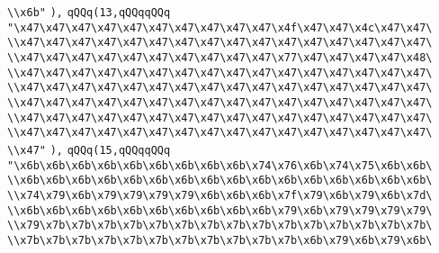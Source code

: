 \verb|\\x6b"|\newline
\verb|),|\newline
\verb|qQQq(13,qQQqqQQq|\newline
\verb|"\x47\x47\x47\x47\x47\x47\x47\x47\x47\x47\x4f\x47\x47\x4c\x47\x47\|\newline
\verb|\\x47\x47\x47\x47\x47\x47\x47\x47\x47\x47\x47\x47\x47\x47\x47\x47\|\newline
\verb|\\x47\x47\x47\x47\x47\x47\x47\x47\x47\x47\x77\x47\x47\x47\x47\x48\|\newline
\verb|\\x47\x47\x47\x47\x47\x47\x47\x47\x47\x47\x47\x47\x47\x47\x47\x47\|\newline
\verb|\\x47\x47\x47\x47\x47\x47\x47\x47\x47\x47\x47\x47\x47\x47\x47\x47\|\newline
\verb|\\x47\x47\x47\x47\x47\x47\x47\x47\x47\x47\x47\x47\x47\x47\x47\x47\|\newline
\verb|\\x47\x47\x47\x47\x47\x47\x47\x47\x47\x47\x47\x47\x47\x47\x47\x47\|\newline
\verb|\\x47\x47\x47\x47\x47\x47\x47\x47\x47\x47\x47\x47\x47\x47\x47\x47\|\newline
\verb|\\x47"|\newline
\verb|),|\newline
\verb|qQQq(15,qQQqqQQq|\newline
\verb|"\x6b\x6b\x6b\x6b\x6b\x6b\x6b\x6b\x6b\x74\x76\x6b\x74\x75\x6b\x6b\|\newline
\verb|\\x6b\x6b\x6b\x6b\x6b\x6b\x6b\x6b\x6b\x6b\x6b\x6b\x6b\x6b\x6b\x6b\|\newline
\verb|\\x74\x79\x6b\x79\x79\x79\x79\x6b\x6b\x6b\x7f\x79\x6b\x79\x6b\x7d\|\newline
\verb|\\x6b\x6b\x6b\x6b\x6b\x6b\x6b\x6b\x6b\x6b\x79\x6b\x79\x79\x79\x79\|\newline
\verb|\\x79\x7b\x7b\x7b\x7b\x7b\x7b\x7b\x7b\x7b\x7b\x7b\x7b\x7b\x7b\x7b\|\newline
\verb|\\x7b\x7b\x7b\x7b\x7b\x7b\x7b\x7b\x7b\x7b\x7b\x6b\x79\x6b\x79\x6b\|\newline
